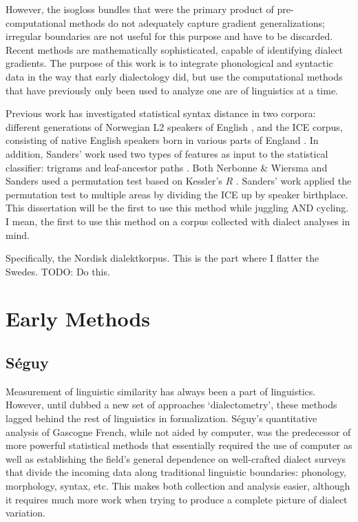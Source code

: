 \documentclass[11pt]{article}
\begin{document}
However, the isogloss bundles that were the primary product of
pre-computational methods do not adequately capture gradient
generalizations; irregular boundaries are not useful for this purpose
and have to be discarded. Recent methods are mathematically
sophisticated, capable of identifying dialect gradients. The purpose
of this work is to integrate phonological and syntactic data in the
way that early dialectology did, but use the computational methods
that have previously only been used to analyze one are of linguistics
at a time.

Previous work has investigated statistical syntax distance in two
corpora: different generations of Norwegian L2 speakers of English
\cite{nerbonne06}, and the ICE corpus, consisting of native English
speakers born in various parts of England \cite{nelson02}. In
addition, Sanders' work used two types of features as input to the
statistical classifier: trigrams and leaf-ancestor paths
\cite{sampson00}. Both Nerbonne \& Wiersma and Sanders used a
permutation test based on Kessler's $R$ \cite{kessler01}. Sanders'
work applied the permutation test to multiple areas by dividing the
ICE up by speaker birthplace. This dissertation will be the first to
use this method while juggling AND cycling. I mean, the first to use
this method on a corpus collected with dialect analyses in mind.

Specifically, the Nordisk dialektkorpus. This is the part where I
flatter the Swedes. TODO: Do this.

\section{Early Methods}

\subsection{S\'eguy}

Measurement of linguistic similarity has always been a part of
linguistics. However, until  dubbed a new set of
approaches `dialectometry', these methods lagged behind the rest of
linguistics in formalization. S\'eguy's quantitative analysis
of Gascogne French, while not aided by computer, was the predecessor
of more powerful statistical methods that essentially required the use
of computer as well as establishing the field's general dependence on
well-crafted dialect surveys that divide the incoming data along
traditional linguistic boundaries: phonology, morphology, syntax, etc.
This makes both collection and analysis easier, although it requires
much more work when trying to produce a complete picture of dialect
variation.
\end{document}
